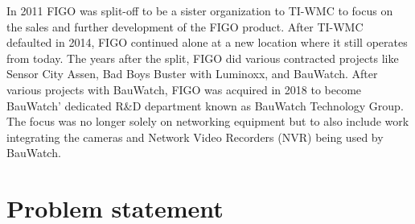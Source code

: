 In 2011 FIGO was split-off to be a sister organization to TI-WMC to focus on the sales and further development of the FIGO product.
After TI-WMC defaulted in 2014, FIGO continued alone at a new location where it still operates from today. 
The years after the split, FIGO did various contracted projects like Sensor City Assen, Bad Boys Buster with Luminoxx, and BauWatch.
After various projects with BauWatch, FIGO was acquired in 2018 to become BauWatch' dedicated R\&D department known as BauWatch Technology Group.
The focus was no longer solely on networking equipment but to also include work integrating the cameras and Network Video Recorders (NVR) being used by BauWatch.

\section{Problem statement}





